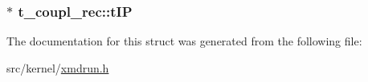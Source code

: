 \hypertarget{structt__coupl__rec_aa19b2bd7792985fc78ea6b3b773c5e34}{
\subsubsection[{t\-I\-P}]{$\ast$ {\bf t\-\_\-coupl\-\_\-rec\-::t\-I\-P}}}\label{structt__coupl__rec_aa19b2bd7792985fc78ea6b3b773c5e34}


\-The documentation for this struct was generated from the following file\-:\begin{DoxyCompactItemize}
\item 
src/kernel/\hyperlink{xmdrun_8h}{xmdrun.\-h}\end{DoxyCompactItemize}
